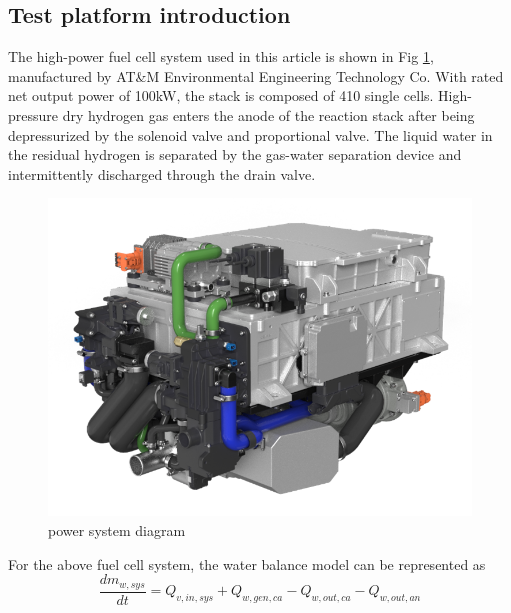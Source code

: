 \subsection{Test platform introduction}
The high-power fuel cell system used in this article is shown in Fig \ref{fig:PowerSystemDiagram}, manufactured by AT\&M Environmental Engineering Technology Co. With rated net output power of 100kW, the stack is composed of 410 single cells. High-pressure dry hydrogen gas enters the anode of the reaction stack after being depressurized by the solenoid valve and proportional valve. The liquid water in the residual hydrogen is separated by the gas-water separation device and intermittently discharged through the drain valve.
\begin{figure}[h]
	\centering

	\includegraphics[scale=0.4]{Research_pictures/picture2.png}
	\caption[short]{power system diagram}
	\label{fig:PowerSystemDiagram}
\end{figure}

For the above fuel cell system, the water balance model can be represented as
\begin{equation} \label{waterBalanceModel}
	\frac{d m_{w,s y s}}{d t}=Q_{v,i n,s y s}+Q_{w,g e n,c a}-Q_{w,o u t,c a}-Q_{w,o u t,a n}
\end{equation}

